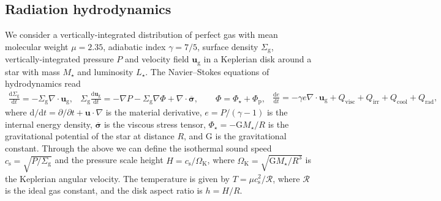 \documentclass[fleqn,usenatbib,useAMS]{mnras}
\newcommand{\tensorGR}[1]{\overline{\bm{{#1}}}}
\newcommand{\D}[2]{\frac{\text{d}{#1}}{\text{d}{#2}}}
\newcommand{\G}{\text{G}}
\newcommand{\Mstar}{M_\star}
\newcommand{\Lstar}{L_\star}
\newcommand{\Rgas}{\mathcal{R}}
\newcommand{\cs}{c_\mathrm{s}}
\newcommand{\OmegaK}{\Omega_\mathrm{K}}
\newcommand{\vel}{\bm{u}}
\newcommand{\Sigmag}{\Sigma_\mathrm{g}}
\newcommand{\velg}{\vel_\mathrm{g}}
\begin{document}
\subsection{Radiation hydrodynamics}

We consider a vertically-integrated distribution of perfect gas with mean molecular weight $\mu=2.35$, adiabatic index $\gamma=7/5$, surface density $\Sigmag$, vertically-integrated pressure $P$ and velocity field $\velg$ in a Keplerian disk around a star with mass $\Mstar$ and luminosity $\Lstar$. The Navier--Stokes equations of hydrodynamics read \citep{tassoul-1978}
%
\begin{subequations}
	\label{eq:navier-stokes}
	\begin{align}
		\label{eq:navier-stokes-1}
		\D{\Sigmag}{t} = -\Sigmag\nabla\cdot\velg,
	\end{align}
	\begin{align}
	\label{eq:navier-stokes-2}
		\Sigmag\D{\velg}{t} =-\nabla P -\Sigmag\nabla\Phi +\nabla\cdot\bm{\tensorGR{\sigma}},\qquad \Phi=\Phi_\star+\Phi_\mathrm{p},
	\end{align}
	\begin{align}
	\label{eq:navier-stokes-3}
		\D{e}{t}=-\gamma e\nabla\cdot\velg+Q_\mathrm{visc}+Q_\mathrm{irr} + Q_\mathrm{cool} + Q_\mathrm{rad},
	\end{align}
\end{subequations}
%
where $\text{d}/\text{d}t=\partial/\partial t + \vel\cdot\nabla$ is the material derivative, $e = P/(\gamma-1)$ is the internal energy density, $\bm{\tensorGR{\sigma}}$ is the viscous stress tensor, $\Phi_\star = -\G\Mstar/R$ is the gravitational potential of the star at distance $R$, and $\G$ is the gravitational constant. Through the above we can define the isothermal sound speed $\cs = \sqrt{P/\Sigmag}$ and the pressure scale height $H = \cs/\OmegaK$, where $\OmegaK = \sqrt{\G\Mstar/R^3}$ is the Keplerian angular velocity. The temperature is given by $T=\mu\cs^2/\Rgas$, where $\Rgas$ is the ideal gas constant, and the disk aspect ratio is $h=H/R$.
\end{document}
